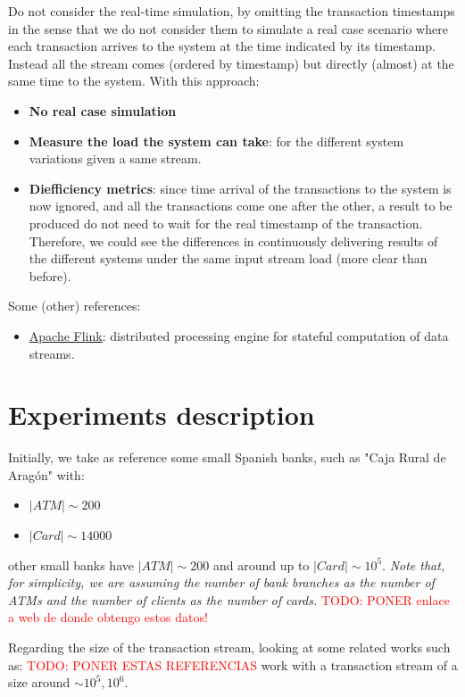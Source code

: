 \documentclass{article}
\begin{document}
Do not consider the real-time simulation, by omitting the transaction timestamps in the sense that we do not consider them to simulate a real case scenario where each transaction arrives to the system at the time indicated by its timestamp. 
Instead all the stream comes (ordered by timestamp) but directly (almost) at the same time to the system. With this approach:
\begin{itemize}
  \item \textbf{No real case simulation}
  \item \textbf{Measure the load the system can take}: for the different system variations given a same stream.
  \item \textbf{Diefficiency metrics}: since time arrival of the transactions to the system is now ignored, and all the transactions come one after the other, a result to be produced do not need to wait for the real timestamp of the transaction. Therefore, we could see the differences in continuously delivering results of the different systems under the same input stream load (more clear than before).
\end{itemize}

Some (other) references:

\begin{itemize}
  \item \href{https://www.confluent.io/es-es/learn/apache-flink/}{Apache Flink}: distributed processing engine for stateful computation of data streams.
\end{itemize}

\section{Experiments description}

Initially, we take as reference some small Spanish banks, such as "Caja Rural de Aragón" with:
\begin{itemize}
  \item $|ATM| \sim 200$
  \item $|Card| \sim 14000$
\end{itemize}

other small banks have $|ATM| \sim 200$ and around up to $|Card| \sim 10^{5}$.
\textit{Note that, for simplicity, we are assuming the number of bank branches as the number of ATMs and the number of clients as the number of cards.}
\textcolor{red}{TODO: PONER enlace a web de donde obtengo estos datos!}


Regarding the size of the transaction stream, looking at some related works such as:
\textcolor{red}{TODO: PONER ESTAS REFERENCIAS}
work with a transaction stream of a size around $\sim 10^{5},10^{6}$.
\end{document}
